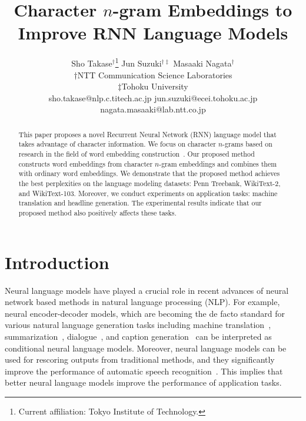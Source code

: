 \documentclass[letterpaper]{article} %
\begin{document}
%
\title{Character $n$-gram Embeddings to Improve RNN Language Models}
\author{Sho Takase$^\dagger$\thanks{Current affiliation: Tokyo Institute of Technology.} \hspace{1.5em} Jun Suzuki$^{\dagger \ddagger}$ \hspace{1.5em} Masaaki Nagata$^\dagger$ \\
  $\dagger$NTT Communication Science Laboratories \\ $\ddagger$Tohoku University \\
  { sho.takase@nlp.c.titech.ac.jp} \hspace{1.5em} { jun.suzuki@ecei.tohoku.ac.jp} \hspace{1.5em} { nagata.masaaki@lab.ntt.co.jp} 
  }
\maketitle
\begin{abstract}
  This paper proposes a novel Recurrent Neural Network (RNN) language model that takes advantage of character information.
  We focus on character $n$-grams based on research in the field of word embedding construction~\cite{wieting-EtAl:2016:EMNLP2016}.
  Our proposed method constructs word embeddings from character $n$-gram embeddings and combines them with ordinary word embeddings.
  We demonstrate that the proposed method achieves the best perplexities on the language modeling datasets: Penn Treebank, WikiText-2, and WikiText-103.
  Moreover, we conduct experiments on application tasks: machine translation and headline generation.
  The experimental results indicate that our proposed method also positively affects these tasks.
\end{abstract}

\section{Introduction}\label{sec:intro}
Neural language models have played a crucial role in recent advances of neural network based methods in natural language processing (NLP).
For example, neural encoder-decoder models, which are becoming the de facto standard for various natural language generation tasks including machine translation~\cite{Sutskever:2014:SSL:2969033.2969173}, summarization~\cite{rush-chopra-weston:2015:EMNLP}, dialogue~\cite{wen-EtAl:2015:EMNLP}, and caption generation~\cite{Vinyals_2015_CVPR} can be interpreted as conditional neural language models.
Moreover, neural language models can be used for rescoring outputs from traditional methods, and they significantly improve the performance of automatic speech recognition~\cite{chime4asr}.
This implies that better neural language models improve the performance of application tasks.
\end{document}
